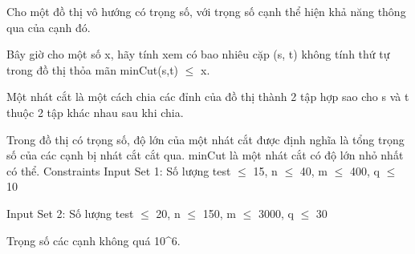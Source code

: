 Cho một đồ thị vô hướng có trọng số, với trọng số cạnh thể hiện khả năng thông qua của cạnh đó.  

   Bây giờ cho một số x, hãy tính xem có bao nhiêu cặp (s, t) không tính thứ tự trong đồ thị thỏa mãn minCut(s,t)  $\le$  x.  

   Một nhát cắt là một cách chia các đỉnh của đồ thị thành 2 tập hợp sao cho s và t thuộc 2 tập khác nhau sau khi chia.  

   Trong đồ thị có trọng số, độ lớn của một nhát cắt được định nghĩa là tổng trọng số của các cạnh bị nhát cắt cắt qua. minCut là một nhát cắt có độ lớn nhỏ nhất có thể.
Constraints
Input Set 1: Số lượng test  $\le$  15, n  $\le$  40, m  $\le$  400, q  $\le$  10  

   Input Set 2: Số lượng test  $\le$  20, n  $\le$  150, m  $\le$  3000, q  $\le$  30  

   Trọng số các cạnh không quá 10^6.